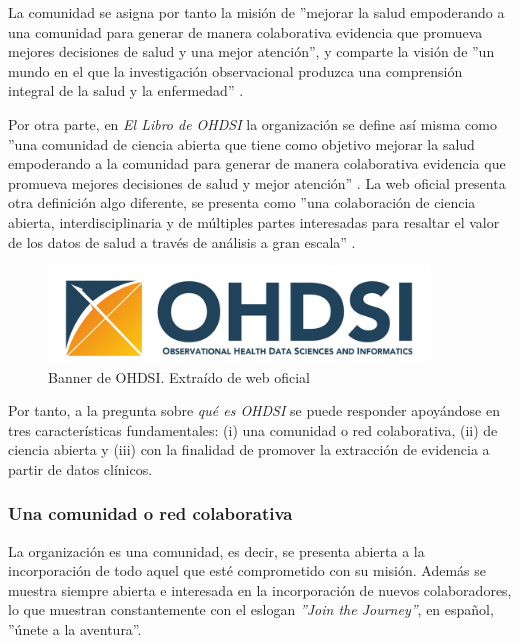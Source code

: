 La comunidad se asigna por tanto la misión de ''mejorar la salud empoderando a una comunidad para generar de manera colaborativa evidencia que promueva mejores decisiones de salud y una mejor atención'', y comparte la visión de ''un mundo en el que la investigación observacional produzca una comprensión integral de la salud y la enfermedad'' \cite{OHDSIwebsite}\cite{OHDSIbook}. 

Por otra parte, en \textit{El Libro de OHDSI} la organización se define así misma como ''una comunidad de ciencia abierta que tiene como objetivo mejorar la salud empoderando a la comunidad para generar de manera colaborativa evidencia que promueva mejores decisiones de salud y mejor atención'' \cite{OHDSIbook}. La web oficial presenta otra definición algo diferente, se presenta como ''una colaboración de ciencia abierta, interdisciplinaria y de múltiples partes interesadas para resaltar el valor de los datos de salud a través de análisis a gran escala'' \cite{OHDSIwebsite}.

\begin{figure}[H]
    \centering
    \includegraphics[width=0.90\textwidth]{figures/OHDSIbanner.png}
    \caption{Banner de OHDSI. Extraído de web oficial \cite{OHDSIwebsite}}
    \label{fig:OHDSIbanner}
\end{figure}

Por tanto, a la pregunta sobre \textit{qué es OHDSI} se puede responder apoyándose en tres características fundamentales: (i)  una comunidad o red colaborativa, (ii) de ciencia abierta y (iii) con la finalidad de promover la extracción de evidencia a partir de datos clínicos.

\subsubsection{Una comunidad o red colaborativa}

La organización es una comunidad, es decir, se presenta abierta a la incorporación de todo aquel que esté comprometido con su misión. Además se muestra siempre abierta e interesada en la incorporación de nuevos colaboradores, lo que muestran constantemente con el eslogan \textit{''Join the Journey''}, en español, ''únete a la aventura''. 

